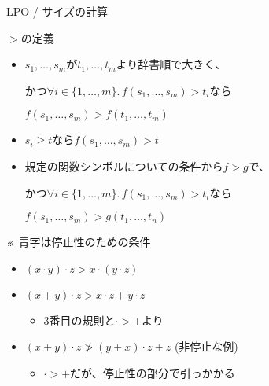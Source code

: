 \documentclass[dvipdfmx,11pt,notheorems]{beamer}
\theoremstyle{definition}
\newcommand{\blue}[1]{{\color{blue} #1}}
\begin{document}
\begin{frame}{LPO / サイズの計算}
  \begin{block}{$>$の定義}
    \begin{itemize}
      \item $s_1, \ldots, s_m$が$t_1, \ldots, t_m$より辞書順で大きく、

      かつ$\forall i \in \{1, \ldots, m\}.\, f(s_1, \ldots, s_m) > t_i$なら

      $f(s_1, \ldots, s_m) > f(t_1, \ldots, t_m)$

      \item $s_i \geq t$なら$f(s_1, \ldots, s_m) > t$

      \item 規定の関数シンボルについての条件から$f>g$で、

      かつ$\forall i \in \{1, \ldots, m\}.\, f(s_1, \ldots, s_m) > t_i$なら

      $f(s_1, \ldots, s_m) > g(t_1, \ldots, t_n)$
    \end{itemize}

    ※\blue{青字}は停止性のための条件
  \end{block}

  \begin{exampleblock}{}
    \begin{itemize}
      \item $(x \cdot y) \cdot z > x \cdot (y \cdot z)$
      \item $(x + y) \cdot z > x \cdot z + y \cdot z$
      \begin{itemize}
        \item 3番目の規則と$\cdot > +$より
      \end{itemize}
      \item $(x + y) \cdot z \not> (y + x) \cdot z + z$ \hspace{10pt} (非停止な例)
      \begin{itemize}
        \item $\cdot > +$だが、停止性の部分で引っかかる
      \end{itemize}
    \end{itemize}
  \end{exampleblock}
\end{frame}
\end{document}
